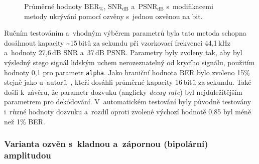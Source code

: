 \begin{figure}[H]
    \table
    \centering
    \caption{Průměrné hodnoty $\mathrm{BER}_{\%}$, $\mathrm{SNR}_\mathrm{dB}$
    a~$\mathrm{PSNR}_\mathrm{dB}$ s~modifikacemi metody ukrývání pomocí
    ozvěny s~jednou ozvěnou na bit.}
    \label{pic:modifications-mean-values-echo-single}
\end{figure}

Ručním testováním a~vhodným výběrem parametrů byla tato metoda schopna
dosáhnout kapacity \textasciitilde15\,bitů za sekundu při vzorkovací frekvenci
44,1\,kHz a~hodnoty 27,6\,dB SNR a~37\,dB PSNR. Parametry byly zvoleny tak, aby
byl výsledný stego signál lidským uchem nerozeznatelný od krycího signálu,
použitím hodnoty 0,1 pro parametr \texttt{alpha}. Jako hraniční hodnota BER
bylo zvoleno 15\% stejně jako u~autorů~\cite{Gruhl1996}, kteří dosáhli průměrné
kapacity 16\,bitů za sekundu. Také došli k~závěru, že parametr dozvuku
(anglicky \textit{decay rate}) byl nejdůležitějším parametrem pro dekódování.
V~automatickém testování byly původně testovány i~různé hodnoty dozvuku
a~rozdíl oproti zvolené výchozí hodnotě 0,85 byl méně než 1\% BER.

\subsubsection*{Varianta ozvěn s~kladnou a~zápornou (bipolární) amplitudou}
\label{ssub:eval:echo-bipolar}

